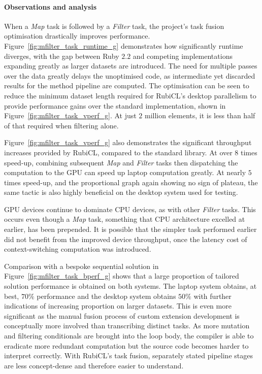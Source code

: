 \paragraph*{Observations and analysis}
When a \emph{Map} task is followed by a \emph{Filter} task, the project's task fusion optimisation drastically improves performance.
Figure~\ref{fig:mfilter_task_runtime_g} demonstrates how significantly runtime diverges, with the gap between Ruby $2.2$ and competing implementations expanding greatly as larger datasets are introduced.
The need for multiple passes over the data greatly delays the unoptimised code, as intermediate yet discarded results for the method pipeline are computed.
The optimisation can be seen to reduce the minimum dataset length required for RubiCL's desktop parallelism to provide performance gains over the standard implementation, shown in Figure~\ref{fig:mfilter_task_vperf_g}. At just $2$ million elements, it is less than half of that required when filtering alone.

Figure~\ref{fig:mfilter_task_vperf_g} also demonstrates the significant throughput increases provided by RubiCL, compared to the standard library. At over $8$ times speed-up, combining subsequent \emph{Map} and \emph{Filter} tasks then dispatching the computation to the \ac{GPU} can speed up laptop computation greatly. At nearly $5$ times speed-up, and the proportional graph again showing no sign of plateau, the same tactic is also highly beneficial on the desktop system used for testing.

\ac{GPU} devices continue to dominate \ac{CPU} devices, as with other \emph{Filter} tasks. This occurs even though a \emph{Map} task, something that \ac{CPU} architecture excelled at earlier, has been prepended. It is possible that the simpler task performed earlier did not benefit from the improved device throughput, once the latency cost of context-switching computation was introduced.

Comparison with a bespoke sequential solution in Figure~\ref{fig:mfilter_task_bperf_g} shows that a large proportion of tailored solution performance is obtained on both systems.
The laptop system obtains, at best, $70\%$ performance and the desktop system obtains $50\%$ with further indications of increasing proportion on larger datasets.
This is even more significant as the manual fusion process of custom extension development is conceptually more involved than transcribing distinct tasks.
As more mutation and filtering conditionals are brought into the loop body, the compiler is able to eradicate more redundant computation but the source code becomes harder to interpret correctly. With RubiCL's task fusion, separately stated pipeline stages are less concept-dense and therefore easier to understand.

